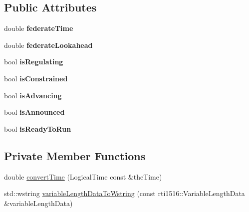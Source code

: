 \subsection*{Public Attributes}
\begin{DoxyCompactItemize}
\item 
\hypertarget{class_example_fed_amb_a8a69e5741467af89b88f78cd8f13dbc3}{
double {\bfseries federateTime}}
\label{class_example_fed_amb_a8a69e5741467af89b88f78cd8f13dbc3}

\item 
\hypertarget{class_example_fed_amb_a041ccd1ec026cb265fbfeecae23b3910}{
double {\bfseries federateLookahead}}
\label{class_example_fed_amb_a041ccd1ec026cb265fbfeecae23b3910}

\item 
\hypertarget{class_example_fed_amb_a46e252b54687c4e65ab8828e3dd63fb8}{
bool {\bfseries isRegulating}}
\label{class_example_fed_amb_a46e252b54687c4e65ab8828e3dd63fb8}

\item 
\hypertarget{class_example_fed_amb_aef8f58dd82e592ccde04ad13c09df051}{
bool {\bfseries isConstrained}}
\label{class_example_fed_amb_aef8f58dd82e592ccde04ad13c09df051}

\item 
\hypertarget{class_example_fed_amb_a976cde3536e8fe2d7ff510ada085a368}{
bool {\bfseries isAdvancing}}
\label{class_example_fed_amb_a976cde3536e8fe2d7ff510ada085a368}

\item 
\hypertarget{class_example_fed_amb_a1f884d79ea713aeb5256a4e30c8db1fa}{
bool {\bfseries isAnnounced}}
\label{class_example_fed_amb_a1f884d79ea713aeb5256a4e30c8db1fa}

\item 
\hypertarget{class_example_fed_amb_ab208dda183eceac54089afee4bd5f828}{
bool {\bfseries isReadyToRun}}
\label{class_example_fed_amb_ab208dda183eceac54089afee4bd5f828}

\end{DoxyCompactItemize}
\subsection*{Private Member Functions}
\begin{DoxyCompactItemize}
\item 
double \hyperlink{class_example_fed_amb_a92b9228114730b2620633bae0cdff3a6}{convertTime} (LogicalTime const \&theTime)
\item 
std::wstring \hyperlink{class_example_fed_amb_ad7429d1ac4d3d70c0afb5cd607f67924}{variableLengthDataToWstring} (const rti1516::VariableLengthData \&variableLengthData)
\end{DoxyCompactItemize}


